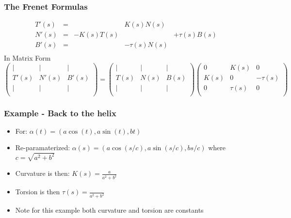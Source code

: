 \documentclass[10pt]{beamer}
\begin{document}
\begin{frame}
  \frametitle{The Frenet Formulas}
  \[
    \begin{array}{rclll}
      T'(s)   &=& & K(s) N(s )& \\
      N'(s)   &=&-K(s) T(s) && + \tau(s) B(s)\\
      B'(s)   & =& & -\tau(s) N(s) \\
    \end{array}
  \]
  In Matrix Form
  \[
    \left(
      \begin{array}{ccc}
        | & | & | \\
        T'(s) & N'(s) & B'(s)\\
        | & | & | \\
      \end{array}
    \right) =
    \left(
      \begin{array}{ccc}
        | & | & | \\
        T(s) & N(s) & B(s)\\
        | & | & | \\
      \end{array}
    \right)
    \left(
      \begin{array}{ccc}
        0 & K(s)& 0 \\
        K(s) & 0 & -\tau(s)\\
        0  & \tau(s) & 0\\
      \end{array}
    \right)
  \]
\end{frame}

\begin{frame}
  \frametitle{Example - Back to the helix}
  \begin{itemize}
  \item For: $\alpha(t) = (a \cos(t), a \sin(t), bt)$
  \item Re-paramaterized: $\alpha(s) = (a \cos(s/c), a \sin(s/c), b s/c)$ where $c = \sqrt{a^2 + b^2}$
  \item Curvature is then: $K(s) = \frac{a}{a^2+b^2}$
  \item Torsion is then $\tau(s) = \frac{}{a^2+b^2}$
  \item Note for this example both curvature and torsion are constants
  \end{itemize}
\end{frame}
\end{document}
